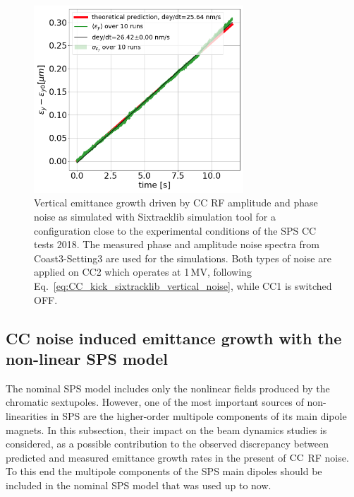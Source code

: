 \begin{figure}[!h]
    \centering         
    \includegraphics[width=0.7\textwidth]{images/Ch6/study_4_AN_PN_sxitracklib.png}
        \caption{Vertical emittance growth driven by CC RF amplitude and phase noise as simulated with Sixtracklib simulation tool for a configuration close to the experimental conditions of the SPS CC tests 2018. The measured phase and amplitude noise spectra from Coast3-Setting3 are used for the simulations. Both types of noise are applied on CC2 which operates at 1\,MV, following Eq.~\eqref{eq:CC_kick_sixtracklib_vertical_noise}, while CC1 is switched OFF.}
        \label{fig:study_4_sixtracklib_global_cc_scheme_measured_spectra_AN_and_PN}
\end{figure}


\subsection{CC noise induced emittance growth with the non-linear SPS model}\label{subsec:global_CC_sixtracklib_noiseCoast3_setting3_non_linear_sps}


The nominal SPS model includes only the nonlinear fields produced by the chromatic sextupoles. However, one of the most important sources of non-linearities in SPS are the higher-order multipole components of its main dipole magnets. In this subsection, their impact on the beam dynamics studies is considered, as a possible contribution to the observed discrepancy between predicted and measured emittance growth rates in the present of ${\mathrm{CC}}$ RF noise. To this end the multipole components of the SPS main dipoles should be included in the nominal SPS model that was used up to now.


